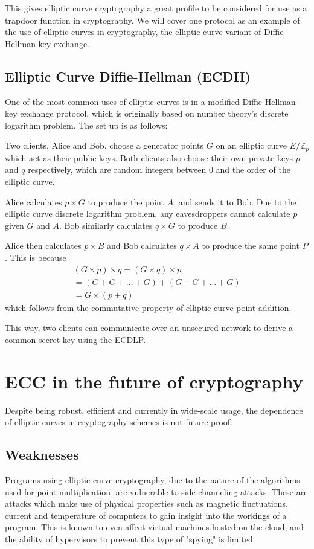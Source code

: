 \documentclass[a4paper]{article}
\begin{document}
This gives elliptic curve cryptography a great profile to be considered for use as a trapdoor function in cryptography.\cite{nist} We will cover one protocol as an example of the use of elliptic curves in cryptography, the elliptic curve variant of Diffie-Hellman key exchange.

\subsection{Elliptic Curve Diffie-Hellman (ECDH)}

One of the most common uses of elliptic curves is in a modified Diffie-Hellman key exchange protocol, which is originally based on number theory's discrete logarithm problem. The set up is as follows:

Two clients, Alice and Bob, choose a generator points $G$ on an elliptic curve $E/\mathbb{Z}_p$ which act as their public keys. Both clients also choose their own private keys $p$ and $q$ respectively, which are random integers between $0$ and the order of the elliptic curve.

Alice calculates $p \times G$ to produce the point $A$, and sends it to Bob. Due to the elliptic curve discrete logarithm problem, any eavesdroppers cannot calculate  $p$ given $G$ and $A$. Bob similarly calculates $q \times G$ to produce $B$.

Alice then calculates $p \times B$ and Bob calculates $q \times A$ to produce the same point $P$. This is because 
\begin{align*}
    (G \times p) \times q = (G \times q) \times p \\
    = (G + G + \dots + G) + (G + G + \dots + G) \\
    = G \times (p + q)
\end{align*}
which follows from the commutative property of elliptic curve point addition.

This way, two clients can communicate over an unsecured network to derive a common secret key using the ECDLP.\cite{practical}


\section{ECC in the future of cryptography}

Despite being robust, efficient and currently in wide-scale usage, the dependence of elliptic curves in cryptography schemes is not future-proof.

\subsection{Weaknesses}\label{weak}
Programs using elliptic curve cryptography, due to the nature of the algorithms used for point multiplication, are vulnerable to side-channeling attacks.\cite{nist} These are attacks which make use of physical properties such as magnetic fluctuations, current and temperature of computers to gain insight into the workings of a program. This is known to even affect virtual machines hosted on the cloud, and the ability of hypervisors to prevent this type of "spying" is limited.\cite{cloud}
\end{document}
